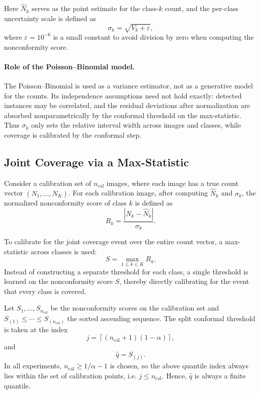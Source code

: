 \documentclass[smallextended,natbib]{svjour3}
\begin{document}
Here \(\hat{N}_k\) serves as the point estimate for the class-\(k\) count, and the
per-class uncertainty scale is defined as
\begin{equation}
\sigma_k = \sqrt{V_k+\varepsilon},
\end{equation}
where \(\varepsilon=10^{-6}\) is a small constant to avoid division by zero when
computing the nonconformity score.

\paragraph{Role of the Poisson--Binomial model.}
The Poisson--Binomial is used as a variance estimator, not as a generative model
for the counts. Its independence assumptions need not hold exactly: detected
instances may be correlated, and the residual deviations after normalization are
absorbed nonparametrically by the conformal threshold on the max-statistic. Thus
\(\sigma_k\) only sets the relative interval width across images and classes, while
coverage is calibrated by the conformal step.

\subsection{Joint Coverage via a Max-Statistic}\label{sec:jci}

Consider a calibration set of \(n_{\mathrm{cal}}\) images, where each image has a
true count vector \((N_1,\dots,N_K)\). For each calibration image, after computing
\(\hat{N}_k\) and \(\sigma_k\), the normalized nonconformity score of class \(k\)
is defined as
\begin{equation}
R_k = \frac{|N_k-\hat{N}_k|}{\sigma_k}.
\end{equation}

To calibrate for the joint coverage event over the entire count vector, a
max-statistic across classes is used:
\begin{equation}
S = \max_{1\leq k\leq K} R_k.
\end{equation}
Instead of constructing a separate threshold for each class, a single threshold is
learned on the nonconformity score \(S\), thereby directly calibrating for the
event that every class is covered.

Let \(S_1,\dots,S_{n_{\mathrm{cal}}}\) be the nonconformity scores on the
calibration set and \(S_{(1)}\leq \cdots \leq S_{(n_{\mathrm{cal}})}\) the sorted
ascending sequence. The split conformal threshold is taken at the index
\begin{equation}
j = \left\lceil (n_{\mathrm{cal}}+1)(1-\alpha) \right\rceil,
\end{equation}
and
\begin{equation}
\hat{q} = S_{(j)}.
\end{equation}
In all experiments, \(n_{\mathrm{cal}} \ge 1/\alpha - 1\) is chosen, so the above
quantile index always lies within the set of calibration points, i.e.
\(j \le n_{\mathrm{cal}}\). Hence, \(\hat q\) is always a finite quantile.
\end{document}
